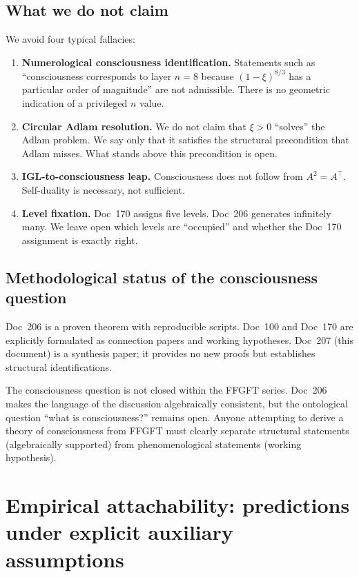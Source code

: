 \subsection{What we do not claim}

We avoid four typical fallacies:

\begin{enumerate}
\item \textbf{Numerological consciousness identification.} Statements such as ``consciousness corresponds to layer $n = 8$ because $(1-\xi)^{8/3}$ has a particular order of magnitude'' are not admissible. There is no geometric indication of a privileged $n$ value.
\item \textbf{Circular Adlam resolution.} We do not claim that $\xi > 0$ ``solves'' the Adlam problem. We say only that it satisfies the structural precondition that Adlam misses. What stands above this precondition is open.
\item \textbf{IGL-to-consciousness leap.} Consciousness does not follow from $A^2 = A^\top$. Self-duality is necessary, not sufficient.
\item \textbf{Level fixation.} Doc~170 assigns five levels. Doc~206 generates infinitely many. We leave open which levels are ``occupied'' and whether the Doc~170 assignment is exactly right.
\end{enumerate}

\subsection{Methodological status of the consciousness question}

Doc~206 is a proven theorem with reproducible scripts. Doc~100 and Doc~170 are explicitly formulated as connection papers and working hypotheses. Doc~207 (this document) is a synthesis paper; it provides no new proofs but establishes structural identifications.

\begin{interpretation}
The consciousness question is not closed within the FFGFT series. Doc~206 makes the language of the discussion algebraically consistent, but the ontological question ``what is consciousness?'' remains open. Anyone attempting to derive a theory of consciousness from FFGFT must clearly separate structural statements (algebraically supported) from phenomenological statements (working hypothesis).
\end{interpretation}

\section{Empirical attachability: predictions under explicit auxiliary assumptions}\label{sec:predictions}

